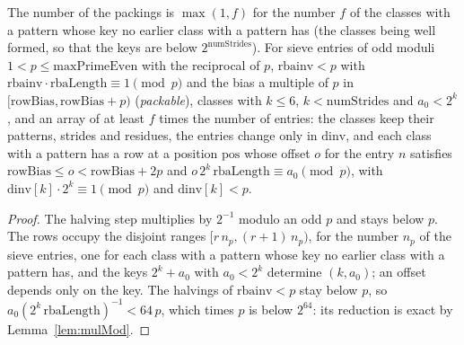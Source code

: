 \begin{lemma}\label{lem:classOffsets}
  \leanok
  The number of the packings is $\max(1, f)$ for the number $f$ of the classes with a pattern whose
  key no earlier class with a pattern has (the classes being well formed, so that the keys are below
  $2^{\mathrm{numStrides}}$). For sieve entries of odd moduli $1 < p \le \mathrm{maxPrimeEven}$ with
  the reciprocal of $p$, $\mathrm{rbainv} < p$ with
  $\mathrm{rbainv} \cdot \mathrm{rbaLength} \equiv 1 \pmod p$ and the bias a multiple of $p$ in
  $[\mathrm{rowBias}, \mathrm{rowBias} + p)$ (\emph{packable}), classes with $k \le 6$,
  $k < \mathrm{numStrides}$ and $a_0 < 2^k$, and an array of at least $f$ times the number of
  entries: the classes keep their patterns, strides and residues, the entries change only in
  $\mathrm{dinv}$, and each class with a pattern has a row at a position $\mathrm{pos}$ whose offset
  $o$ for the entry $n$ satisfies $\mathrm{rowBias} \le o < \mathrm{rowBias} + 2p$ and
  $o\, 2^k\,\mathrm{rbaLength} \equiv a_0 \pmod p$, with
  $\mathrm{dinv}[k] \cdot 2^k \equiv 1 \pmod p$ and $\mathrm{dinv}[k] < p$.
\end{lemma}

\begin{proof}
  \leanok
  The halving step multiplies by $2^{-1}$ modulo an odd $p$ and stays below $p$. The rows occupy the
  disjoint ranges $[r\, n_p, (r + 1)\, n_p)$, for the number $n_p$ of the sieve entries, one for
  each class with a pattern whose key no earlier class with a pattern has, and the keys $2^k + a_0$
  with $a_0 < 2^k$ determine $(k, a_0)$; an offset depends only on the key. The halvings of
  $\mathrm{rbainv} < p$ stay below $p$, so $a_0 (2^k\,\mathrm{rbaLength})^{-1} < 64\, p$, which
  times $p$ is below $2^{64}$: its reduction is exact by Lemma~\ref{lem:mulMod}.
\end{proof}

